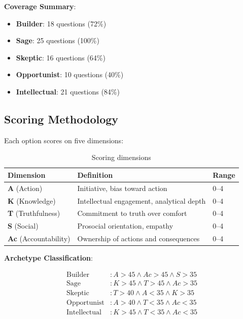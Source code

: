 \documentclass[11pt,a4paper]{article}
\begin{document}
\textbf{Coverage Summary}:
\begin{itemize}[leftmargin=*]
    \item \textbf{Builder}: 18 questions (72\%)
    \item \textbf{Sage}: 25 questions (100\%)
    \item \textbf{Skeptic}: 16 questions (64\%)
    \item \textbf{Opportunist}: 10 questions (40\%)
    \item \textbf{Intellectual}: 21 questions (84\%)
\end{itemize}

\subsection{Scoring Methodology}

Each option scores on five dimensions:

\begin{table}[h]
\centering
\begin{tabular}{lll}
\toprule
\textbf{Dimension} & \textbf{Definition} & \textbf{Range} \\
\midrule
\textbf{A} (Action) & Initiative, bias toward action & 0--4 \\
\textbf{K} (Knowledge) & Intellectual engagement, analytical depth & 0--4 \\
\textbf{T} (Truthfulness) & Commitment to truth over comfort & 0--4 \\
\textbf{S} (Social) & Prosocial orientation, empathy & 0--4 \\
\textbf{Ac} (Accountability) & Ownership of actions and consequences & 0--4 \\
\bottomrule
\end{tabular}
\caption{Scoring dimensions}
\end{table}

\textbf{Archetype Classification}:

\begin{align*}
\text{Builder} &: A > 45 \land Ac > 45 \land S > 35 \\
\text{Sage} &: K > 45 \land T > 45 \land Ac > 35 \\
\text{Skeptic} &: T > 40 \land A < 35 \land K > 35 \\
\text{Opportunist} &: A > 40 \land T < 35 \land Ac < 35 \\
\text{Intellectual} &: K > 45 \land T < 35 \land Ac < 35
\end{align*}
\end{document}
